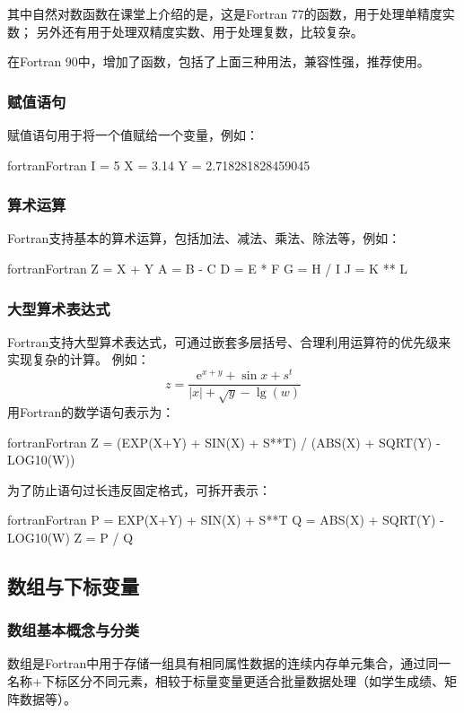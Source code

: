 其中自然对数函数在课堂上介绍的是，这是Fortran 77的函数，用于处理单精度实数；
另外还有用于处理双精度实数、用于处理复数，比较复杂。

在Fortran 90中，增加了函数，包括了上面三种用法，兼容性强，推荐使用。

\subsubsection{赋值语句}
赋值语句用于将一个值赋给一个变量，例如：
\begin{envcode}{fortran}{Fortran}
      I = 5
      X = 3.14
      Y = 2.718281828459045
\end{envcode}

\subsubsection{算术运算}
Fortran支持基本的算术运算，包括加法、减法、乘法、除法等，例如：
\begin{envcode}{fortran}{Fortran}
      Z = X + Y
      A = B - C
      D = E * F
      G = H / I
      J = K ** L
\end{envcode}

\subsubsection{大型算术表达式}
Fortran支持大型算术表达式，可通过嵌套多层括号、合理利用运算符的优先级来实现复杂的计算。
例如：
\begin{equation*}
      z = \frac{\mathrm{e}^{x+y}+\sin{x}+s^t}{\left|x\right| + \sqrt{y} - \lg(w)}
\end{equation*}
用Fortran的数学语句表示为：
\begin{envcode}{fortran}{Fortran}
      Z = (EXP(X+Y) + SIN(X) + S**T) / (ABS(X) + SQRT(Y) - LOG10(W))
\end{envcode}

为了防止语句过长违反固定格式，可拆开表示：
\begin{envcode}{fortran}{Fortran}
      P = EXP(X+Y) + SIN(X) + S**T
      Q = ABS(X) + SQRT(Y) - LOG10(W)
      Z = P / Q
\end{envcode}

\subsection{数组与下标变量}

\subsubsection{数组基本概念与分类}
数组是Fortran中用于存储一组具有相同属性数据的连续内存单元集合，通过同一名称+下标区分不同元素，相较于标量变量更适合批量数据处理（如学生成绩、矩阵数据等）。

